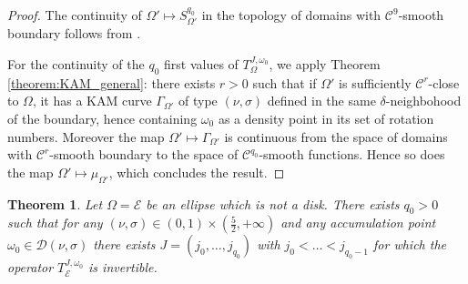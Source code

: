 \documentclass[12pt, openany]{amsart}
\newtheorem{theorem}{Theorem}%
\theoremstyle{definition}
\theoremstyle{remark}
\theoremstyle{remark}
\theoremstyle{theorem}
\theoremstyle{theorem}
\theoremstyle{theorem}
\theoremstyle{theorem}
\begin{document}
\begin{proof}
The continuity of $\Omega'\mapsto S_{\Omega'}^{q_0}$ in the topology of domains with $\mathscr C^9$-smooth boundary follows from \cite{DKW}. 

For the continuity of the $q_0$ first values of $T_{\Omega}^{J,\omega_0}$, we apply Theorem \ref{theorem:KAM_general}: there exists $r>0$ such that if $\Omega'$ is sufficiently $\mathscr C^r$-close to $\Omega$, it has a KAM curve $\Gamma_{\Omega'}$ of type $(\nu,\sigma)$ defined in the same $\delta$-neighbohood of the boundary, hence containing $\omega_0$ as a density point in its set of rotation numbers. Moreover the map $\Omega'\mapsto\Gamma_{\Omega'}$ is continuous from the space of domains with $\mathscr C^r$-smooth boundary to the space of $\mathscr C^{q_0}$-smooth functions. Hence so does the map $\Omega'\mapsto\mu_{\Omega'}$, which concludes the result.
\end{proof}

\begin{theorem}
\label{theorem:invertibility_ellipse}
Let $\Omega=\mathscr E$ be an ellipse which is not a disk. There exists $q_0>0$ such that for any $(\nu,\sigma)\in(0,1)\times(\frac{5}{2},+\infty)$ and any accumulation point $\omega_0\in\mathcal D(\nu,\sigma)$ there exists $J=(j_0,\ldots,j_{q_0})$ with $j_0<\ldots<j_{q_0-1}$ for which the operator
$T_{\mathscr E}^{J,\omega_0}$ is invertible. 
\end{theorem}
\end{document}
